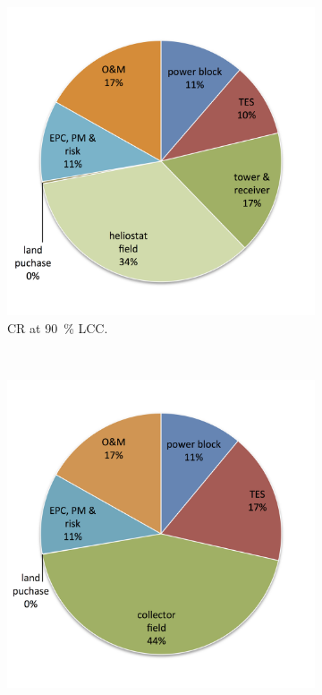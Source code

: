 \begin{figure}[htbp]
        \centering                
        \begin{subfigure}[b]{0.5\textwidth}
                \centering
                \includegraphics[width=1\textwidth]{FIG/CR_LCOE_90_BreakDown}
                \caption{CR at \SI{90}{\percent} LCC.}\label{CR_LCOE_90_BreakDown}
        \end{subfigure}%
        ~
        \begin{subfigure}[b]{0.5\textwidth}
                \centering
                \includegraphics[width=1\textwidth]{FIG/PTC_LCOE_90_BreakDown}

\end{subfigure}
\end{figure}
